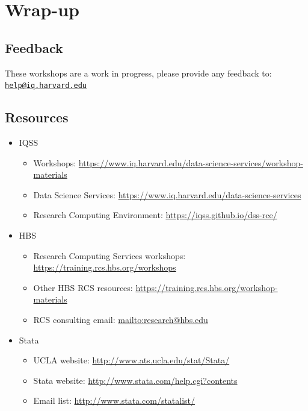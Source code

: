 \documentclass[
]{book}
\providecommand{\tightlist}{%
  \setlength{\itemsep}{0pt}\setlength{\parskip}{0pt}}
\begin{document}
\hypertarget{wrap-up-9}{%
\section{Wrap-up}\label{wrap-up-9}}

\hypertarget{feedback-9}{%
\subsection{Feedback}\label{feedback-9}}

These workshops are a work in progress, please provide any feedback to: \href{mailto:help@iq.harvard.edu}{\nolinkurl{help@iq.harvard.edu}}

\hypertarget{resources-12}{%
\subsection{Resources}\label{resources-12}}

\begin{itemize}
\tightlist
\item
  IQSS

  \begin{itemize}
  \tightlist
  \item
    Workshops: \url{https://www.iq.harvard.edu/data-science-services/workshop-materials}
  \item
    Data Science Services: \url{https://www.iq.harvard.edu/data-science-services}
  \item
    Research Computing Environment: \url{https://iqss.github.io/dss-rce/}
  \end{itemize}
\item
  HBS

  \begin{itemize}
  \tightlist
  \item
    Research Computing Services workshops: \url{https://training.rcs.hbs.org/workshops}
  \item
    Other HBS RCS resources: \url{https://training.rcs.hbs.org/workshop-materials}
  \item
    RCS consulting email: \url{mailto:research@hbs.edu}
  \end{itemize}
\item
  Stata

  \begin{itemize}
  \tightlist
  \item
    UCLA website: \url{http://www.ats.ucla.edu/stat/Stata/}
  \item
    Stata website: \url{http://www.stata.com/help.cgi?contents}
  \item
    Email list: \url{http://www.stata.com/statalist/}
  \end{itemize}
\end{itemize}
\end{document}
